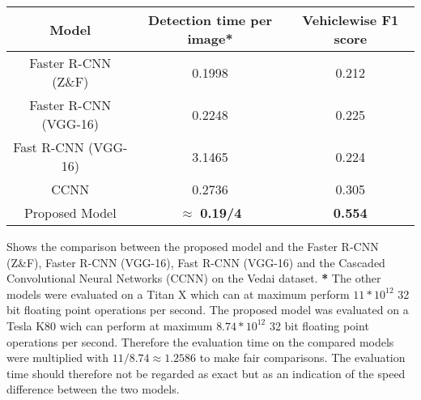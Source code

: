 \documentclass{kththesis}
\begin{document}
\begin{center}
 \label{tab:vedai} 
\begin{tabular}{|c | c c|}
\hline
\textbf{Model} & \textbf{Detection time per image*}  & \textbf{Vehiclewise F1 score}\\
\hline
Faster R-CNN (Z\&F) & 0.1998 & 0.212\\
Faster R-CNN (VGG-16) & 0.2248 & 0.225\\
Fast R-CNN (VGG-16) & 3.1465 &  0.224\\
CCNN &0.2736 &  0.305\\
Proposed Model & $\approx$ \textbf{0.19/4} & \textbf{0.554}\\
\hline
\end{tabular}
\caption{Shows the comparison between the proposed model and the Faster R-CNN (Z\&F), Faster R-CNN (VGG-16), Fast R-CNN (VGG-16) \parencite{zeiler_visualizing_2014} and the Cascaded Convolutional Neural Networks (CCNN) \parencite{zhong_robust_2017-1} on the Vedai dataset. \textbf{*} The other models were evaluated on a Titan X which can at maximum perform $11*10^{12}$ 32 bit floating point operations per second. The proposed model was evaluated on a Tesla K80 wich can perform at maximum $8.74*10^{12}$ 32 bit floating point operations per second. Therefore the evaluation time on the compared models were multiplied with $11/8.74\approx1.2586$ to make fair comparisons. The evaluation time should therefore not be regarded as exact but as an indication of the speed difference between the two models.}
\end{center}

\printbibliography[heading=bibintoc] %
\end{document}
